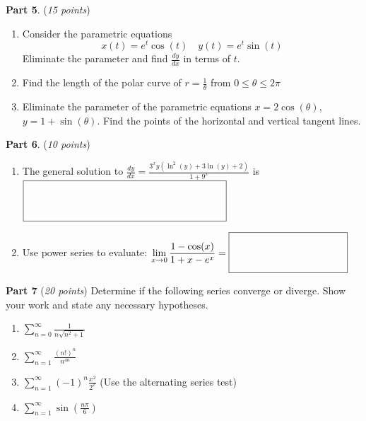 \documentclass[12pt]{article}
\begin{document}
\newpage 

\textbf{Part 5}. (\textit{15 points})  
\begin{enumerate}[label=\textbf{Q\arabic*}]
    \item Consider the parametric equations
    \[
        x(t)=e^{t}\cos(t) \quad y(t)=e^{t}\sin(t)
    \]
    Eliminate the parameter and find $\displaystyle\frac{dy}{dx}$ in terms of $t$. 
    \vspace{6cm}
    \item Find the length of the polar curve of $\displaystyle r=\frac{1}{\theta}$ from $0\leq \theta\leq 2\pi$ 
    \vspace{5cm} 
    \item Eliminate the parameter of the parametric equations $x=2\cos(\theta)$, $y=1+\sin(\theta)$. Find the points of the  horizontal and vertical tangent lines. 
\end{enumerate}

\newpage 

\textbf{Part 6}. (\textit{10 points})
\begin{enumerate}[label=\textbf{Q\arabic*}]
    \item The general solution to $\displaystyle \frac{dy}{dx}=\frac{3^{x}y\left(\ln^{2}(y)+3\ln(y)+2\right)}{1+9^{x}}$ is $\fbox{\raisebox{-0.4\height}{\makebox[7cm]{\rule{0pt}{8ex}}}}$
    \vspace{5.00in}
    \item Use power series to evaluate: $\displaystyle \lim_{x\to 0}\frac{1-\cos(x)}{1+x-e^{x}}=\fbox{\raisebox{-0.4\height}{\makebox[4cm]{\rule{0pt}{8ex}}}}$
\end{enumerate}

\newpage

\textbf{Part 7} (\textit{20 points}) Determine if the following series converge or diverge. Show your work and state any necessary hypotheses. 
\begin{enumerate}[label=\textbf{Q\arabic*}]
    \item $\displaystyle\sum_{n=0}^{\infty}\frac{1}{n\sqrt{n^{2}+1}}$
    \vspace{3.5cm}
    \item $\displaystyle \sum_{n=1}^{\infty}\frac{(n!)^{n}}{n^{4n}}$
    \vspace{3.5cm}
    \item $\displaystyle\sum_{n=1}^{\infty}(-1)^{n}\frac{x^{2}}{2^{x}}$ (Use the alternating series test)
    \vspace{3.5cm}
    \item $\displaystyle\sum_{n=1}^{\infty}\sin\left(\frac{n\pi}{6}\right)$
    \end{enumerate}
\end{document}
